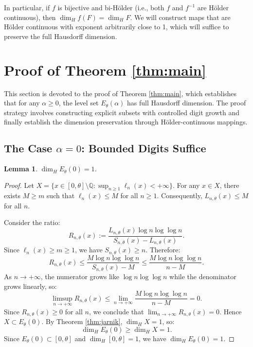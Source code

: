 \documentclass{article}
\newtheorem{lemma}[theorem]{Lemma}
\numberwithin{equation}{section}
\begin{document}
In particular, if $f$ is bijective and bi-Hölder (i.e., both $f$ and $f^{-1}$ are Hölder continuous), then $\dim_H f(F) = \dim_H F$. We will construct maps that are Hölder continuous with exponent arbitrarily close to 1, which will suffice to preserve the full Hausdorff dimension.

\section{Proof of Theorem \ref{thm:main}}

This section is devoted to the proof of Theorem \ref{thm:main}, which establishes that for any $\alpha \geq 0$, the level set $E_\theta(\alpha)$ has full Hausdorff dimension. The proof strategy involves constructing explicit subsets with controlled digit growth and finally establish the dimension preservation through H\"older-continuous mappings. 

\subsection{The Case $\alpha = 0$: Bounded Digits Suffice}

\begin{lemma}\label{lem:alpha0}
$\dim_H E_\theta(0) = 1$.
\end{lemma}

\begin{proof}
Let $X = \{x \in [0,\theta] \setminus \mathbb{Q} : \sup_{n \geq 1} \ell_n(x) < +\infty\}$. For any $x \in X$, there exists $M \geq m$ such that $\ell_n(x) \leq M$ for all $n \geq 1$. Consequently, $L_{n,\theta}(x) \leq M$ for all $n$.

Consider the ratio:
\[
R_{n,\theta}(x) := \frac{L_{n,\theta}(x) \log n \log \log n}{S_{n,\theta}(x) - L_{n,\theta}(x)}.
\]
%
Since $\ell_n(x) \geq m \geq 1$, we have $S_{n,\theta}(x) \geq n$. Therefore:
\[
R_{n,\theta}(x) \leq \frac{M \log n \log \log n}{S_{n,\theta}(x) - M} \leq \frac{M \log n \log \log n}{n - M}.
\]
%
As $n \to +\infty$, the numerator grows like $\log n \log \log n$ while the denominator grows linearly, so:
\[
\limsup_{n \to +\infty} R_{n,\theta}(x) \leq \lim_{n \to +\infty} \frac{M \log n \log \log n}{n - M} = 0.
\]
%
Since $R_{n,\theta}(x) \geq 0$ for all $n$, we conclude that $\displaystyle\lim_{n \to +\infty} R_{n,\theta}(x) = 0$. Hence $X \subset E_\theta(0)$.
By Theorem \ref{thm:jarnik}, $\dim_H X = 1$, so:
\[
\dim_H E_\theta(0) \geq \dim_H X = 1.
\]
Since $E_\theta(0) \subset [0, \theta]$ and $\dim_H [0, \theta] = 1$, we have $\dim_H E_\theta(0) = 1$.
\end{proof}
\end{document}
